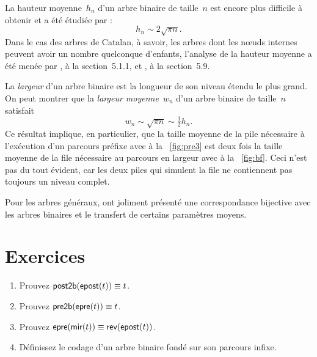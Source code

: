 
La hauteur moyenne~\(h_n\) d'un
arbre binaire de taille~\(n\) est encore plus difficile à obtenir et a
été étudiée par
\cite{FlajoletOdlyzko_1981,BrownShubert_1984,FlajoletOdlyzko_1984,Odlyzko_1984}:
\begin{equation*}
h_n \sim 2 \sqrt{\pi n}.
\end{equation*}
Dans le cas des arbres de Catalan, à savoir, les arbres dont les
n{\oe}uds internes peuvent avoir un nombre quelconque d'enfants,
l'analyse de la hauteur moyenne a été menée par
\cite{DasarathyYang_1980,DershowitzZaks_1981}, \cite{Kemp_1984} à la
section~5.1.1, \cite{DershowitzZaks_1990,KnuthdeBruijnRice_2000b} et
\cite{SedgewickFlajolet_1996}, à la
section~5.9.


La \emph{largeur} d'un arbre binaire est
la longueur de son niveau étendu le plus grand. On peut montrer que la \emph{largeur
  moyenne}~\(w_n\) d'un arbre binaire de
taille~\(n\) satisfait
\begin{equation*}
w_n \sim \sqrt{\pi n} \sim \tfrac{1}{2} h_n.
\end{equation*}
Ce résultat implique, en particulier, que la taille moyenne de la pile
nécessaire à l'exécution d'un parcours préfixe avec
 à la
\fig~\vref{fig:pre3} est deux fois la taille moyenne de la file
nécessaire au parcours en largeur avec 
à la \fig~\vref{fig:bf}. Ceci n'est pas du tout évident, car les deux
piles qui simulent la file ne contiennent pas toujours un niveau
complet.

Pour les arbres généraux, \cite{DasarathyYang_1980} ont joliment
présenté une correspondance bijective avec les arbres binaires et le
transfert de certains paramètres moyens.

\section*{Exercices}

\begin{enumerate}

  \item Prouvez \(\textsf{post2b}(\textsf{epost}(t)) \equiv t\).

  \item Prouvez \(\textsf{pre2b}(\textsf{epre}(t)) \equiv t\).

  \item Prouvez \(\textsf{epre}(\textsf{mir}(t)) \equiv
    \textsf{rev}(\textsf{epost}(t))\).

  \item Définissez le codage d'un arbre binaire fondé sur son parcours
    infixe.

\end{enumerate}
